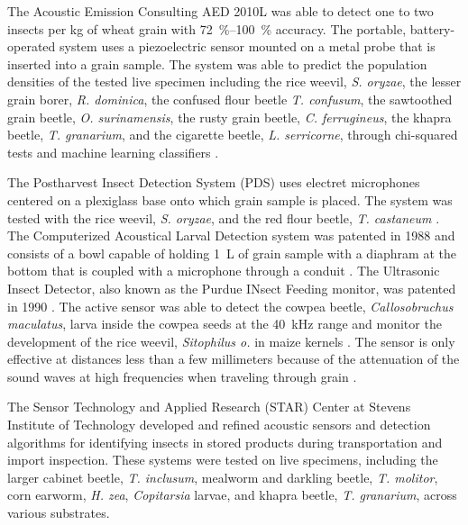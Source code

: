The Acoustic Emission Consulting AED 2010L was able to detect one to two insects per \si{\kilo\gram} of wheat grain with \SIrange{72}{100}{\percent} accuracy. The portable, battery-operated system uses a piezoelectric sensor mounted on a metal probe that is inserted into a grain sample. The system was able to predict the population densities of the tested live specimen including the rice weevil, \textit{S. oryzae}, the lesser grain borer, \textit{R. dominica}, the confused flour beetle \textit{T. confusum}, the sawtoothed grain beetle, \textit{O. surinamensis}, the rusty grain beetle, \textit{C. ferrugineus}, the khapra beetle, \textit{T. granarium}, and the cigarette beetle, \textit{L. serricorne}, through chi-squared tests and machine learning classifiers \cite{eliopoulosDetectionAdultBeetles2015,eliopoulosEstimationPopulationDensity2016}.

The Postharvest Insect Detection System (PDS) uses electret microphones centered on a plexiglass base onto which grain sample is placed. The system was tested with the rice weevil, \textit{S. oryzae}, and the red flour beetle, \textit{T. castaneum} \cite{mankinPerformanceLowCostAcoustic2020}. The Computerized Acoustical Larval Detection system was patented in 1988 and consists of a bowl capable of holding \SI{1}{\liter} of grain sample with a diaphram at the bottom that is coupled with a microphone through a conduit \cite{j.c.webb.c.a.litzkowComputerizedAcousticalLarval1988}. The Ultrasonic Insect Detector, also known as the Purdue INsect Feeding monitor, was patented in 1990 \cite{shadeDetectionHiddenInsect1990}. The active sensor was able to detect the cowpea beetle, \textit{Callosobruchus maculatus}, larva inside the cowpea seeds at the \SI{40}{\kilo\hertz} range \cite{shadeUltrasonicInsectDetector1989} and monitor the development of the rice weevil, \textit{Sitophilus o.} in maize kernels \cite{pittendrighMonitoringRiceWeevil1997}. The sensor is only effective at distances less than a few millimeters because of the attenuation of the sound waves at high frequencies when traveling through grain \cite{shadeUltrasonicInsectDetector1989}.

The Sensor Technology and Applied Research (STAR) Center at Stevens Institute of Technology developed and refined acoustic sensors and detection algorithms for identifying insects in stored products during transportation and import inspection. These systems were tested on live specimens, including the larger cabinet beetle, \textit{T. inclusum}, mealworm and darkling beetle, \textit{T. molitor}, corn earworm, \textit{H. zea}, \textit{Copitarsia} larvae, and khapra beetle, \textit{T. granarium}, across various substrates.

